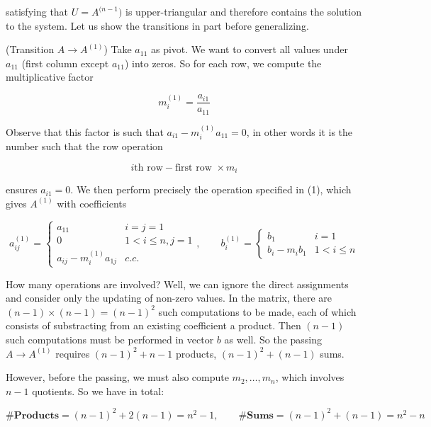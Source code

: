 \documentclass[12pt]{article}
\theoremstyle{definition}
\begin{document}
satisfying that $U = A^{(n-1})$ is upper-triangular and therefore contains the
solution to the system. Let us show the transitions in part before generalizing. 

(Transition $A \to A^{(1)}$) Take $a_{11}$ as pivot. We want to convert all
values under $a_{11}$ (first column except $a_{11}$) into zeros. So for each
row, we compute the multiplicative factor 

\begin{equation*}
    m_i^{(1)} = \frac{ a_{i1} }{a_{11}}
\end{equation*}

Observe that this factor is such that $a_{i1} - m_i^{(1)} a_{11} = 0$, in other words
it is the number such that the row operation

\begin{equation}
i\text{th row} - \text{first row } \times  m_i
\end{equation}

ensures $a_{i1} = 0$. We then perform precisely the operation specified in (1),
which gives $A^{(1)}$ with coefficients 

\begin{equation*}
    a^{(1)}_{ij} = \begin{cases}
        a_{11} & i = j = 1 \\ 
        0 & 1 < i \leq n, j = 1 \\ 
        a_{ij} - m^{(1)}_i a_{1j} & c.c.
    \end{cases}, \qquad b^{(1)}_{i} = \begin{cases}
        b_1 & i = 1 \\ 
        b_i - m_i b_1 & 1 < i \leq n
    \end{cases}
\end{equation*}

How many operations are involved? Well, we can ignore the direct assignments 
and consider only the updating of non-zero values. In the matrix, there are $(n-1) \times (n-1)
= (n-1)^2$ such computations to be made, each of which consists of substracting
from an existing coefficient a product. Then $(n-1)$ such computations must be
performed in vector $b$ as well. So the passing $A \to A^{(1)}$ requires 
$(n-1)^2 + n-1$ products, $(n-1)^2 + (n-1)$ sums. 

However, before the passing, we must also compute $m_2, \ldots, m_{n}$, which
involves $n-1$ quotients. So we have in total: 

\begin{equation}
    \textbf{\#Products} = (n-1)^2 + 2(n-1) = n^2 -1, \qquad \textbf{\#Sums} =
    (n-1)^2 + (n-1) = n^2 - n
\end{equation}
\end{document}
